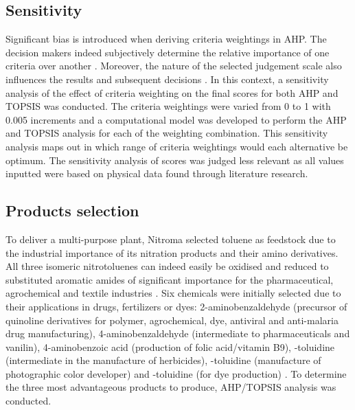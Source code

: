 \subsection{Sensitivity} %

Significant bias is introduced when deriving criteria weightings in AHP. The decision makers indeed subjectively determine the relative importance of one criteria over another \cite{triantaphyllou_sensitivity_1997}. Moreover, the nature of the selected judgement scale also influences the results and subsequent decisions \cite{franek_judgment_2014}. In this context, a sensitivity analysis of the effect of criteria weighting on the final scores for both AHP and TOPSIS was conducted. The criteria weightings were varied from 0 to 1 with 0.005 increments and a computational model was developed to perform the AHP and TOPSIS analysis for each of the weighting combination. This sensitivity analysis maps out in which range of criteria weightings would each alternative be optimum. The sensitivity analysis of scores was judged less relevant as all values inputted were based on physical data found through literature research.



\subsection{Products selection}

To deliver a multi-purpose plant, Nitroma selected toluene as feedstock due to the industrial importance of its nitration products and their amino derivatives. All three isomeric nitrotoluenes can indeed easily be oxidised and reduced to substituted aromatic amides of significant importance for the pharmaceutical, agrochemical and textile industries \cite{dugal_nitrobenzene_2005}. Six chemicals were initially selected due to their applications in drugs, fertilizers or dyes: 2-aminobenzaldehyde (precursor of quinoline derivatives for polymer, agrochemical, dye, antiviral and anti-malaria drug manufacturing), 4-aminobenzaldehyde (intermediate to pharmaceuticals and vanilin), 4-aminobenzoic acid (production of folic acid/vitamin B9), \ortho-toluidine (intermediate in the manufacture of herbicides), \meta-toluidine (manufacture of  photographic color developer) and \para-toluidine (for dye production) \cite{bowers_toluidines_2000,bruhne_benzaldehyde_2011,maki_benzoic_2000}. To determine the three most advantageous products to produce, AHP/TOPSIS analysis was conducted.

